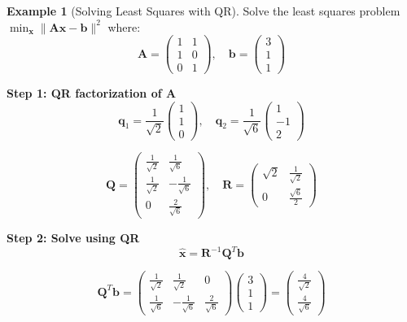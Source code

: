 \documentclass[12pt]{article}
\numberwithin{equation}{section}
\newcommand{\vect}[1]{\boldsymbol{#1}}   %
\newcommand{\mat}[1]{\mathbf{#1}}        %
\theoremstyle{plain}
\theoremstyle{definition}
\newtheorem{example}[theorem]{Example}
\theoremstyle{remark}
\begin{document}
\begin{example}[Solving Least Squares with QR]
Solve the least squares problem $\min_{\vect{x}} \|\mat{A}\vect{x} - \vect{b}\|^2$ where:
$$\mat{A} = \begin{pmatrix} 1 & 1 \\ 1 & 0 \\ 0 & 1 \end{pmatrix}, \quad \vect{b} = \begin{pmatrix} 3 \\ 1 \\ 1 \end{pmatrix}$$

\textbf{Step 1: QR factorization of A}
$$\vect{q}_1 = \frac{1}{\sqrt{2}}\begin{pmatrix} 1 \\ 1 \\ 0 \end{pmatrix}, \quad \vect{q}_2 = \frac{1}{\sqrt{6}}\begin{pmatrix} 1 \\ -1 \\ 2 \end{pmatrix}$$

$$\mat{Q} = \begin{pmatrix} \frac{1}{\sqrt{2}} & \frac{1}{\sqrt{6}} \\ \frac{1}{\sqrt{2}} & -\frac{1}{\sqrt{6}} \\ 0 & \frac{2}{\sqrt{6}} \end{pmatrix}, \quad \mat{R} = \begin{pmatrix} \sqrt{2} & \frac{1}{\sqrt{2}} \\ 0 & \frac{\sqrt{6}}{2} \end{pmatrix}$$

\textbf{Step 2: Solve using QR}
$$\hat{\vect{x}} = \mat{R}^{-1}\mat{Q}^T\vect{b}$$

$$\mat{Q}^T\vect{b} = \begin{pmatrix} \frac{1}{\sqrt{2}} & \frac{1}{\sqrt{2}} & 0 \\ \frac{1}{\sqrt{6}} & -\frac{1}{\sqrt{6}} & \frac{2}{\sqrt{6}} \end{pmatrix}\begin{pmatrix} 3 \\ 1 \\ 1 \end{pmatrix} = \begin{pmatrix} \frac{4}{\sqrt{2}} \\ \frac{4}{\sqrt{6}} \end{pmatrix}$$


\end{example}
\end{document}

